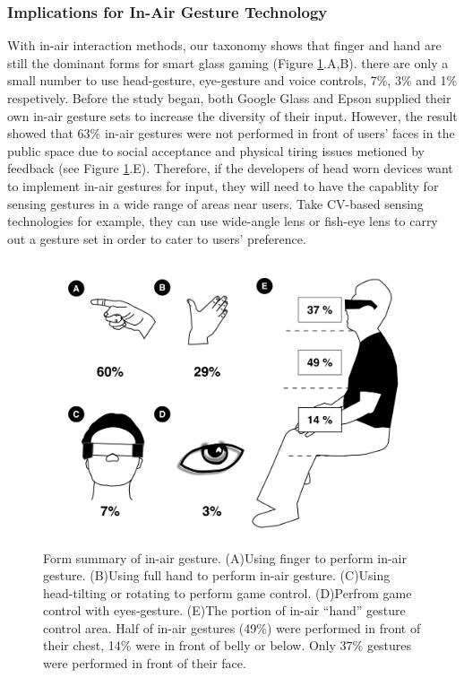 \documentclass{sigchi}
\begin{document}
    \subsubsection{Implications for In-Air Gesture Technology}
    With in-air interaction methods, our taxonomy shows that finger and hand are still the dominant  forms for smart glass gaming (Figure \ref{fig:figureInAirPorpotion}.{A,B}). there are only a small number to use head-gesture, eye-gesture and voice controls, 7\%, 3\% and 1\% respetively.
    Before the study began, both Google Glass and Epson\cite{GoogleGlass, Colaco:2013:MCL:2501988.2502042} supplied their own in-air gesture sets to increase the diversity of their input. However, the result showed that 63\% in-air gestures were not performed in front of users' faces in the public space due to social acceptance and physical tiring issues metioned by feedback (see Figure \ref{fig:figureInAirPorpotion}.E). Therefore, if the developers of head worn devices want to implement in-air gestures for input, they will need to have the capablity for sensing gestures in a wide range of areas near users. Take CV-based sensing technologies for example, they can use wide-angle lens or fish-eye lens to carry out a gesture set in order to cater to users' preference.   
  \begin{figure}[!h]
  \centering
  \includegraphics[width=1\columnwidth]{InAirControlArea.pdf}
  \caption{Form summary of in-air gesture. (A)Using finger to perform in-air gesture. (B)Using full hand to perform in-air gesture. (C)Using head-tilting or rotating to perform game control. (D)Perfrom game control with eyes-gesture. (E)The portion of in-air ``hand'' gesture control area. Half of in-air gestures (49\%) were performed in front of their chest, 14\% were in front of belly or below. Only 37\% gestures were performed in front of their face.}
  \label{fig:figureInAirPorpotion}
  \end{figure}
\end{document}
